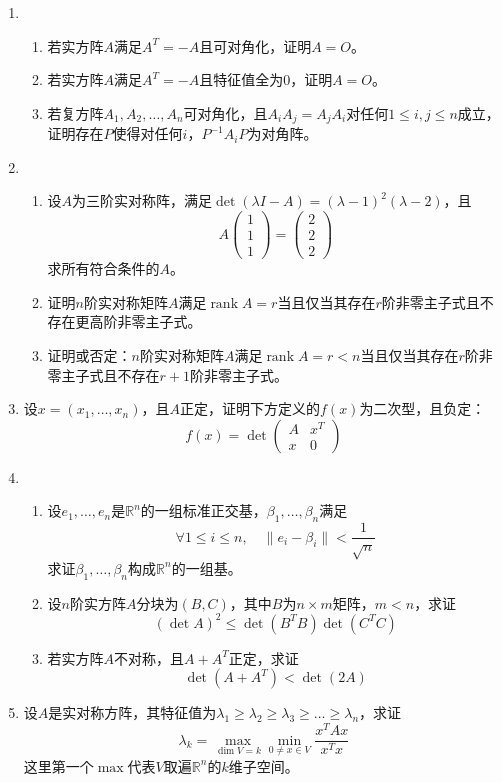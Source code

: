 \documentclass[a4paper,UTF8,fontset=windows]{ctexart}
\DeclareMathOperator{\rank}{rank}
\begin{document}
\begin{enumerate}
    \item 
    \begin{enumerate}
        \item 若实方阵$A$满足$A^T=-A$且可对角化，证明$A=O$。
        \item 若实方阵$A$满足$A^T=-A$且特征值全为0，证明$A=O$。
        \item 若复方阵$A_1,A_2,\dots,A_n$可对角化，且$A_iA_j=A_jA_i$对任何$1\le i,j\le n$成立，证明存在$P$使得对任何$i$，$P^{-1}A_iP$为对角阵。
    \end{enumerate}
    
    \item
    \begin{enumerate}
        \item 设$A$为三阶实对称阵，满足$\det(\lambda I-A)=(\lambda-1)^2(\lambda-2)$，且
        $$A\begin{pmatrix}1\\1\\1\end{pmatrix}=\begin{pmatrix}2\\2\\2\end{pmatrix}$$
        求所有符合条件的$A$。
        \item 证明$n$阶实对称矩阵$A$满足$\rank A=r$当且仅当其存在$r$阶非零主子式且不存在更高阶非零主子式。
        \item 证明或否定：$n$阶实对称矩阵$A$满足$\rank A=r<n$当且仅当其存在$r$阶非零主子式且不存在$r+1$阶非零主子式。
    \end{enumerate}

    \item 设$x=(x_1,\dots,x_n)$，且$A$正定，证明下方定义的$f(x)$为二次型，且负定：
    $$f(x)=\det\begin{pmatrix}A&x^T\\x&0\end{pmatrix}$$

    \item 
    \begin{enumerate}
        \item 设$e_1,\dots,e_n$是$\mathbb{R}^n$的一组标准正交基，$\beta_1,\dots,\beta_n$满足
        $$\forall 1\le i\le n,\quad\|e_i-\beta_i\|<\frac{1}{\sqrt n}$$
        求证$\beta_1,\dots,\beta_n$构成$\mathbb{R}^n$的一组基。
        \item 设$n$阶实方阵$A$分块为$(B,C)$，其中$B$为$n\times m$矩阵，$m<n$，求证
        $$(\det A)^2\le\det(B^TB)\det(C^TC)$$
        \item 若实方阵$A$不对称，且$A+A^T$正定，求证
        $$\det(A+A^T)<\det(2A)$$
    \end{enumerate}

    \item 设$A$是实对称方阵，其特征值为$\lambda_1\ge\lambda_2\ge\lambda_3\ge\dots\ge\lambda_n$，求证
    $$\lambda_k=\max_{\dim V=k}\min_{0\ne x\in V}\frac{x^TAx}{x^Tx}$$
    这里第一个$\max$代表$V$取遍$\mathbb{R}^n$的$k$维子空间。
\end{enumerate}
\end{document}
